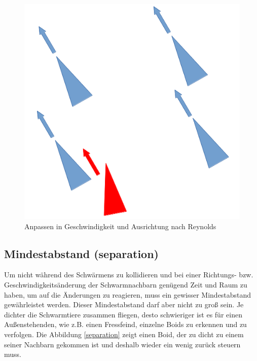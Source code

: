 \documentclass[draft=false
              ,paper=a4
              ,twoside=false
              ,fontsize=11pt
              ,headsepline
              ,BCOR10mm
              ,DIV11
              ,bibtotoc
              ,liststotoc
              ]{scrbook}
\begin{document}
\begin{figure}[!h]
\centering
\includegraphics[scale=0.4]{project/alignment.png}
\caption{Anpassen in Geschwindigkeit und Ausrichtung nach Reynolds \cite{reynolds87}}
\label{alignment}
\end{figure}

\subsection{Mindestabstand (separation)}
Um nicht während des Schwärmens zu kollidieren und bei einer Richtungs- bzw. Geschwindigkeitsänderung der Schwarmnachbarn genügend Zeit und Raum zu haben, um auf die Änderungen zu reagieren, muss ein gewisser Mindestabstand gewährleistet werden. Dieser Mindestabstand darf aber nicht zu groß sein. Je dichter die Schwarmtiere zusammen fliegen, desto schwieriger ist es für einen Außenstehenden, wie z.B. einen Fressfeind, einzelne Boids zu erkennen und zu verfolgen. Die Abbildung \ref{separation} zeigt einen Boid, der zu dicht zu einem seiner Nachbarn gekommen ist und deshalb wieder ein wenig zurück steuern muss.
\end{document}
